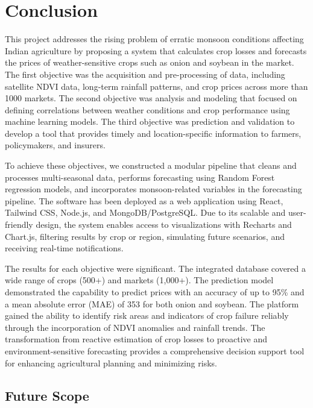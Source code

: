 
\chapter{Conclusion}

This project addresses the rising problem of erratic monsoon conditions affecting Indian agriculture by proposing a system that calculates crop losses and forecasts the prices of weather-sensitive crops such as onion and soybean in the market. The first objective was the acquisition and pre-processing of data, including satellite NDVI data, long-term rainfall patterns, and crop prices across more than 1000 markets. The second objective was analysis and modeling that focused on defining correlations between weather conditions and crop performance using machine learning models. The third objective was prediction and validation to develop a tool that provides timely and location-specific information to farmers, policymakers, and insurers.

To achieve these objectives, we constructed a modular pipeline that cleans and processes multi-seasonal data, performs forecasting using Random Forest regression models, and incorporates monsoon-related variables in the forecasting pipeline. The software has been deployed as a web application using React, Tailwind CSS, Node.js, and MongoDB/PostgreSQL. Due to its scalable and user-friendly design, the system enables access to visualizations with Recharts and Chart.js, filtering results by crop or region, simulating future scenarios, and receiving real-time notifications.

The results for each objective were significant. The integrated database covered a wide range of crops (500+) and markets (1,000+). The prediction model demonstrated the capability to predict prices with an accuracy of up to 95\% and a mean absolute error (MAE) of 353 for both onion and soybean. The platform gained the ability to identify risk areas and indicators of crop failure reliably through the incorporation of NDVI anomalies and rainfall trends. The transformation from reactive estimation of crop losses to proactive and environment-sensitive forecasting provides a comprehensive decision support tool for enhancing agricultural planning and minimizing risks.

\section{Future Scope}

